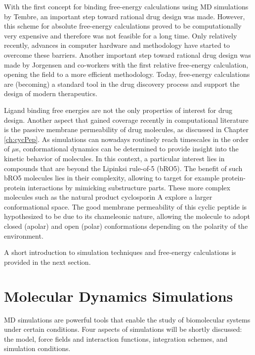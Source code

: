 With the first concept for binding free-energy calculations using MD simulations by Tembre\cite{Tembre1984}, an important step toward rational drug design was made. \cite{Durrant2011}
However, this scheme for absolute free-energy calculations proved to be computationally very expensive and therefore was not feasible for a long time. Only relatively recently, advances in computer hardware and methodology have started to overcome these barriers. \cite{Chodera2011, Aldeghi2016}
Another important step toward rational drug design was made by Jorgensen and co-workers with the first relative free-energy calculation, opening the field to a more efficient methodology.\cite{Jorgensen1983, Jorgensen1988, Chodera2011} 
Today, free-energy calculations are (becoming) a standard tool in the drug discovery process and support the design of modern therapeutics. \cite{Chodera2011, Christ2014,  Cournia2017, Cournia2020, Meier2021}
 
Ligand binding free energies are not the only properties of interest for drug design. Another aspect that gained coverage recently in computational literature is the passive membrane permeability of drug molecules, as discussed in Chapter \ref{ch:cycPep}. \cite{Witek2016, Witek2017, Witek2019,  Wang2021, Marrink1996, Bemporad2004, Lomize2019, Hoang2021, Sugita2021, Corbett2021} 
As simulations can nowadays routinely reach timescales in the order of $\mu$s, conformational dynamics can be determined to provide insight into the kinetic behavior of molecules.\cite{Witek2016, Witek2017} In this context, a particular interest lies in compounds that are beyond the Lipinksi\cite{Lipinski2001} rule-of-5 (bRO5).\cite{Witek2016, Witek2017, Witek2019,  Wang2021, Sugita2021} The benefit of such bRO5 molecules lies in their complexity, allowing to target for example protein-protein interactions by mimicking substructure parts. \cite{Doak2016, Naylor2017, Poongavanam2018, Furukawa2020, Danelius2020} These more complex molecules such as the natural product cyclosporin A explore a larger conformational space. The good membrane permeability of this cyclic peptide is hypothesized to be due to its chameleonic nature, allowing the molecule to adopt closed (apolar) and open (polar) conformations depending on the polarity of the environment.\cite{Witek2016, Witek2017}

A short introduction to simulation techniques and free-energy calculations is provided in the next section.

\section{Molecular Dynamics Simulations}
MD simulations are powerful tools that enable the study of biomolecular systems under certain conditions. Four aspects of simulations will be shortly discussed: the model, force fields and interaction functions, integration schemes, and simulation conditions.

